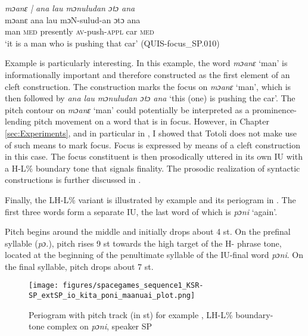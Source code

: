 \ea
\label{ex:moane ana lau monuludan oto ana}
\textit{mɔanɛ | ana lau mɔnuludan ɔtɔ ana} \\
\gll mɔanɛ     ana lau       mɔN-sulud-an    ɔtɔ   ana  \\
man  \textsc{med} presently \textsc{av-}push\textsc{-appl} car   \textsc{med}\\ 
\glt ‘it is a man who is pushing that car’ \hfill(QUIS-focus\_SP.010)
\z




Example   is particularly interesting. 
In this example, the word \textit{mɔanɛ} `man' is informationally important and therefore constructed as the first element of an cleft construction. The  construction marks the focus on  \textit{mɔanɛ} `man', which  is then followed by \textit{ana lau mɔnuludan ɔtɔ ana} `this (one) is pushing the car'. 
The pitch contour on \textit{mɔanɛ} `man'  could potentially be interpreted as a prominence-lending pitch movement on a word that is in focus. However, in Chapter  \ref{sec:Experiments}, and in particular in  , I showed that Totoli does not make use of such means to mark focus. Focus is expressed by means of a cleft construction in this case. The focus constituent is then prosodically uttered in its own IU with a  H-L\% boundary tone that signals finality. The prosodic realization of syntactic constructions is further discussed in  .






Finally, the LH-L\% variant is illustrated by example  and its periogram in  . The first three words form a separate IU, the last word of which is \textit{pɔni} ‘again’.


Pitch begins around the middle and initially drops about 4 st. On the prefinal syllable (\textit{pɔ.}), pitch rises 9 st towards the high target of the H- phrase tone, located at the beginning of the penultimate syllable of the IU-final word \textit{pɔni}. On the final syllable, pitch drops about 7 st.


\begin{figure}
	\texttt{[image: figures/spacegames\_sequence1\_KSR-SP\_extSP\_io\_kita\_poni\_maanuai\_plot.png]}
	\caption{Periogram with pitch track (in st) for example , LH-L\% boundary-tone complex on \textit{pɔni}, speaker SP}
	\label{pitch:io kita poni maanu ai}
\end{figure}


